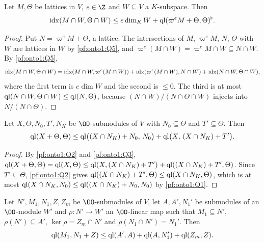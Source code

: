 \begin{lemma}\label{pf:onto1:lastred}
Let $M,\Theta$ be lattices in $V$, $e\in\Z$ and $W\subseteq V$ a $K$-subspace. Then
\[
\operatorname{idx}(M\cap W,\Theta\cap W)\le e\dim_KW+\operatorname{ql}(\varpi^eM+\Theta,\Theta)^\flat .
\]
\end{lemma}

\begin{proof}
Put $N=\varpi^eM+\Theta$, a lattice. The intersections of $M$, $\varpi^eM$, $N$, $\Theta$ with $W$ are lattices
in $W$ by \ref{pf:onto1:Q5}, and $\varpi^e(M\cap W)=\varpi^eM\cap W\subseteq N\cap W$. By \ref{pf:onto1:Q5},
\[
\operatorname{idx}(M\cap W,\Theta\cap W)=\operatorname{idx}(M\cap W,\varpi^e(M\cap W))+\operatorname{idx}(\varpi^e(M\cap W),N\cap W)
+\operatorname{idx}(N\cap W,\Theta\cap W),
\]
where the first term is $e\dim W$ and the second is $\le0$. The third is at most $\operatorname{ql}(N\cap W,\Theta\cap
W)\le\operatorname{ql}(N,\Theta)$, because $(N\cap W)/(N\cap\Theta\cap W)$ injects into $N/(N\cap\Theta)$.
\end{proof}

\begin{lemma}[Splitting]\label{pf:onto1:reduction}
Let $X,\Theta,N_0,T',N_K$ be $\OO$-submodules of $V$ with $N_0\subseteq\Theta$ and $T'\subseteq\Theta$. Then
\[
\operatorname{ql}(X+\Theta,\Theta)\le\operatorname{ql}\bigl((X\cap N_K)+N_0,\,N_0\bigr)+\operatorname{ql}\bigl(X,\,(X\cap N_K)+T'\bigr).
\]
\end{lemma}

\begin{proof}
By \ref{pf:onto1:Q2} and \ref{pf:onto1:Q3}, $\operatorname{ql}(X+\Theta,\Theta)=\operatorname{ql}(X,\Theta)\le\operatorname{ql}(X,(X\cap
N_K)+T')+\operatorname{ql}((X\cap N_K)+T',\Theta)$. Since $T'\subseteq\Theta$, \ref{pf:onto1:Q2} gives
$\operatorname{ql}((X\cap N_K)+T',\Theta)\le\operatorname{ql}(X\cap N_K,\Theta)$, which is at most $\operatorname{ql}(X\cap N_K,N_0)\le
\operatorname{ql}((X\cap N_K)+N_0,N_0)$ by \ref{pf:onto1:Q1}.
\end{proof}

\begin{lemma}[Levels]\label{pf:onto1:levels}
Let $N',M_1,N_1,Z,Z_m$ be $\OO$-submodules of $V$, let $A,A',N_1'$ be submodules of an $\OO$-module $W'$ and
$\rho\colon N'\to W'$ an $\OO$-linear map such that $M_1\subseteq N'$, $\rho(N')\subseteq A'$, $\ker\rho=Z_m\cap N'$
and $\rho(N_1\cap N')=N_1'$. Then
\[
\operatorname{ql}(M_1,N_1+Z)\le\operatorname{ql}(A',A)+\operatorname{ql}(A,N_1')+\operatorname{ql}(Z_m,Z).
\]
\end{lemma}

